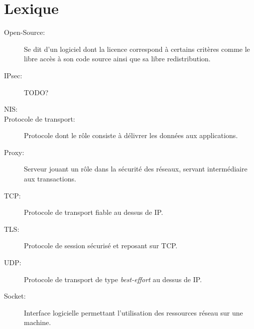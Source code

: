 \section*{Lexique}

\begin{description}
	\item [Open-Source:] Se dit d'un logiciel dont la licence correspond à certains critères comme le libre accès à son code source ainsi que sa libre redistribution.
	\item [IPsec:] TODO?
	\item [NIS:]
	\item [Protocole de transport:] Protocole dont le rôle consiste à délivrer les données aux applications.
	\item [Proxy:] Serveur jouant un rôle dans la sécurité des réseaux, servant intermédiaire aux transactions.
	\item [TCP:] Protocole de transport fiable au dessus de IP.
	\item [TLS:] Protocole de session sécurisé et reposant sur TCP.
	\item [UDP:] Protocole de transport de type \textit{best-effort} au dessus de IP.
	\item [Socket:] Interface logicielle permettant l'utilisation des ressources réseau sur une machine.
\end{description}

\pagebreak